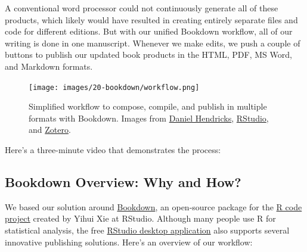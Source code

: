 \documentclass[
  english,
]{book}
\begin{document}
A conventional word processor could not continuously generate all of these products, which likely would have resulted in creating entirely separate files and code for different editions. But with our unified Bookdown workflow, all of our writing is done in one manuscript. Whenever we make edits, we push a couple of buttons to publish our updated book products in the HTML, PDF, MS Word, and Markdown formats.



\begin{figure}
\centering
\texttt{[image: images/20-bookdown/workflow.png]}
\caption{\label{fig:workflow}Simplified workflow to compose, compile, and publish in multiple formats with Bookdown. Images from \href{https://fileicons.org}{Daniel Hendricks}, \href{https://github.com/rstudio/hex-stickers/}{RStudio}, and \href{https://www.zotero.org/support/brand}{Zotero}.}
\end{figure}

Here's a three-minute video that demonstrates the process:



\hypertarget{bookdown-overview-why-and-how}{%
\subsection*{Bookdown Overview: Why and How?}\label{bookdown-overview-why-and-how}}

We based our solution around \href{https://bookdown.org}{Bookdown}, an open-source package for the \href{https://www.r-project.org/}{R code project} created by Yihui Xie at RStudio. Although many people use R for statistical analysis, the free \href{https://rstudio.com/}{RStudio desktop application} also supports several innovative publishing solutions. Here's an overview of our workflow:
\end{document}

